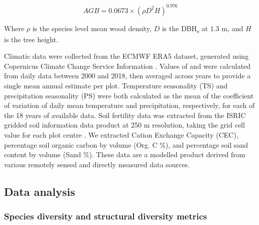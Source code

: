 \documentclass[11pt,a4paper]{article}
\newcommand{\todo}[1]{\textcolor{red}{\textbf{#1}}}   %
\begin{document}
\begin{equation}
	AGB = 0.0673 \times (\rho D^{2} H)^{0.976}
	\label{chave_agb}
\end{equation}

Where $\rho$ is the species level mean wood density, $D$ is the DBH\textsubscript{e} at 1.3 m, and $H$ is the tree height.

Climatic data were collected from the ECMWF ERA5 dataset, generated using Copernicus Climate Change Service Information \citep{ERA5}. Values of  and  were calculated from daily data between 2000 and 2018, then averaged across years to provide a single mean annual estimate per plot. Temperature seasonality (TS) and precipitation seasonality (PS) were both calculated as the mean of the coefficient of variation of daily mean temperature and precipitation, respectively, for each of the 18 years of available data. Soil fertility data was extracted from the ISRIC gridded soil information data product at 250 m resolution, taking the grid cell value for each plot centre \citep{Hengl2017}. We extracted Cation Exchange Capacity (CEC), percentage soil organic carbon by volume (Org. C \%), and percentage soil sand content by volume (Sand \%). These data are a modelled product derived from various remotely sensed and directly measured data sources. 

% 
% 

\subsection{Data analysis}

\subsubsection{Species diversity and structural diversity metrics}
\end{document}
